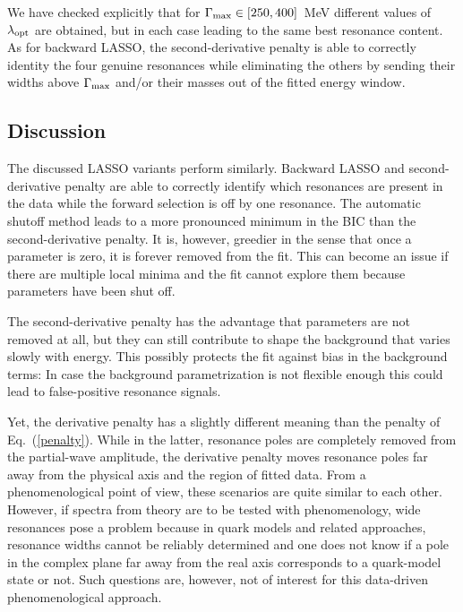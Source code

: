 \documentclass[10pt,aps,prc,superscriptaddress,twoside,twocolumn,nofootinbib,showpacs,preprintnumbers]{revtex4-1}
\begin{document}
We have checked explicitly that for  {${\Gamma_{\rm max}\in [250,400]}$~MeV} different values of $\lambda_{\rm opt}$ are obtained, but in each case leading to the same best resonance content. As for backward LASSO, the second-derivative penalty is able to correctly identity the four genuine resonances while eliminating the others by sending their widths above $\Gamma_{\rm max}$ and/or their masses out of the fitted energy window.


\subsection{Discussion}

The discussed LASSO variants perform similarly. Backward LASSO and second-derivative penalty are able to correctly identify which resonances are present in the data while the forward selection is off by one resonance. The automatic shutoff method leads to a more pronounced minimum in the BIC than the second-derivative penalty. It is, however, greedier in the sense that once a parameter is zero, it is forever removed from the fit. This can become an issue if there are multiple local minima and the fit cannot explore them because parameters have been shut off.

The second-derivative penalty has the advantage that parameters are not removed at all, but they can still contribute to shape the background that varies slowly with energy. This possibly protects the fit against bias in the background terms: In case the background parametrization is not flexible enough this could lead to false-positive resonance signals. 

Yet, the derivative penalty has a slightly different meaning than the penalty of Eq.~(\ref{penalty}). While in the latter, resonance poles are completely removed from the partial-wave amplitude, the derivative penalty moves resonance poles far away from the physical axis and the region of fitted data. From a phenomenological point of view, these scenarios are quite similar to each other. However, if spectra from theory are to be tested with phenomenology, wide resonances pose a problem because in quark models and related approaches, resonance widths cannot be reliably determined and one does not know if a pole in the complex plane far away from the real axis corresponds to a quark-model state or not. Such questions are, however, not of interest for this data-driven phenomenological approach.
\end{document}
